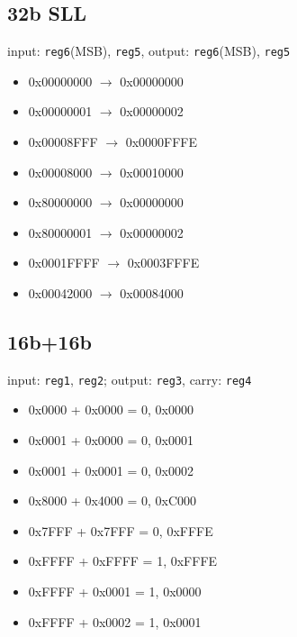 \documentclass[10pt,a4paper]{article}
\theoremstyle{definition}%
\begin{document}
\subsection{32b SLL}
input: \verb!reg6!(MSB), \verb!reg5!, output: \verb!reg6!(MSB), \verb!reg5!
{\ttfamily
\begin{itemize}
\item 0x00000000 $\longrightarrow$ 0x00000000
\item 0x00000001 $\longrightarrow$ 0x00000002
\item 0x00008FFF $\longrightarrow$ 0x0000FFFE
\item 0x00008000 $\longrightarrow$ 0x00010000
\item 0x80000000 $\longrightarrow$ 0x00000000
\item 0x80000001 $\longrightarrow$ 0x00000002
\item 0x0001FFFF $\longrightarrow$ 0x0003FFFE
\item 0x00042000 $\longrightarrow$ 0x00084000
\end{itemize}}

\subsection{16b+16b}
input: \verb!reg1!, \verb!reg2!; output: \verb!reg3!, carry: \verb!reg4!
{\ttfamily
\begin{itemize}
\item 0x0000 + 0x0000 = 0, 0x0000
\item 0x0001 + 0x0000 = 0, 0x0001
\item 0x0001 + 0x0001 = 0, 0x0002
\item 0x8000 + 0x4000 = 0, 0xC000
\item 0x7FFF + 0x7FFF = 0, 0xFFFE
\item 0xFFFF + 0xFFFF = 1, 0xFFFE
\item 0xFFFF + 0x0001 = 1, 0x0000
\item 0xFFFF + 0x0002 = 1, 0x0001
\end{itemize}}
\end{document}
